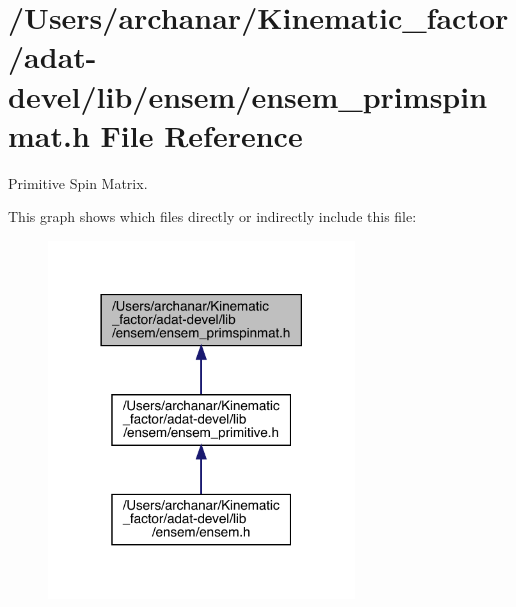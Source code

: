 \hypertarget{adat-devel_2lib_2ensem_2ensem__primspinmat_8h}{}\section{/\+Users/archanar/\+Kinematic\+\_\+factor/adat-\/devel/lib/ensem/ensem\+\_\+primspinmat.h File Reference}
\label{adat-devel_2lib_2ensem_2ensem__primspinmat_8h}


Primitive Spin Matrix.  


This graph shows which files directly or indirectly include this file\+:
\nopagebreak
\begin{figure}[H]
\begin{center}
\leavevmode
\includegraphics[width=230pt]{d9/d94/adat-devel_2lib_2ensem_2ensem__primspinmat_8h__dep__incl}
\end{center}
\end{figure}
